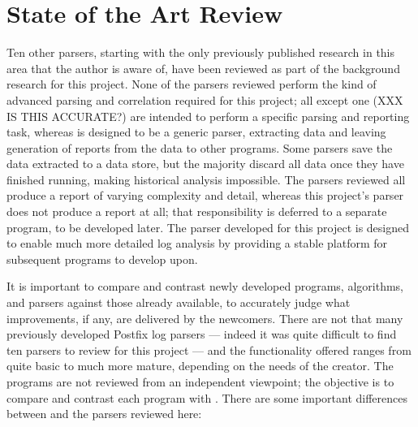 \section{State of the Art Review}

\label{other-parsers}

\label{state of the art review}


Ten other parsers, starting with the only previously published research in
this area that the author is aware of, have been reviewed as part of the
background research for this project.  None of the parsers reviewed perform
the kind of advanced parsing and correlation required for this project; all
except one (XXX IS THIS ACCURATE\@?) are intended to perform a specific
parsing and reporting task, whereas \PLP{} is designed to be a generic
parser, extracting data and leaving generation of reports from the data to
other programs.  Some parsers save the data extracted to a data store, but
the majority discard all data once they have finished running, making
historical analysis impossible.  The parsers reviewed all produce a report
of varying complexity and detail, whereas this project's parser does not
produce a report at all; that responsibility is deferred to a separate
program, to be developed later.  The parser developed for this project is
designed to enable much more detailed log analysis by providing a stable
platform for subsequent programs to develop upon.

It is important to compare and contrast newly developed programs,
algorithms, and parsers against those already available, to accurately
judge what improvements, if any, are delivered by the newcomers.  There are
not that many previously developed Postfix log parsers --- indeed it was
quite difficult to find ten parsers to review for this project --- and the
functionality offered ranges from quite basic to much more mature,
depending on the needs of the creator.  The programs are not reviewed from
an independent viewpoint; the objective is to compare and contrast each
program with \parsername{}.  There are some important differences between
\parsername{} and the parsers reviewed here:

